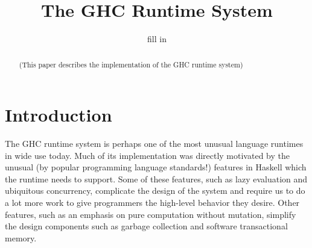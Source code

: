 \documentclass{jfp1}
\title{The GHC Runtime System}
\author{fill in}
\begin{document}
\maketitle

\begin{abstract}
(This paper describes the implementation of the GHC runtime system)
\end{abstract}

\tableofcontents

\section{Introduction}

The GHC runtime system is perhaps one of the most unusual language
runtimes in wide use today.  Much of its implementation was directly
motivated by the unusual (by popular programming language standards!)
features in Haskell which the runtime needs to support.  Some of these
features, such as lazy evaluation and ubiquitous concurrency, complicate
the design of the system and require us to do a lot more work to give
programmers the high-level behavior they desire.  Other features, such
as an emphasis on pure computation without mutation, simplify the design
components such as garbage collection and software transactional memory.


\end{document}
